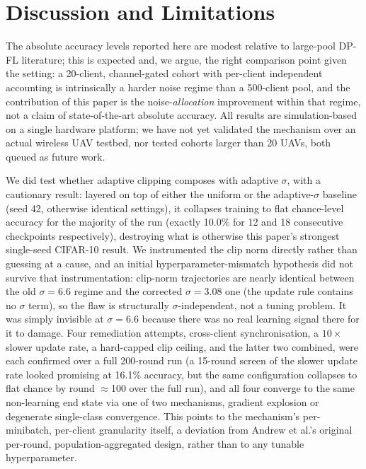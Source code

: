 \documentclass[journal]{IEEEtran}
\begin{document}
\section{Discussion and Limitations}
\label{sec:discussion}

The absolute accuracy levels reported here are modest relative to
large-pool DP-FL literature; this is expected and, we argue, the right
comparison point given the setting: a 20-client, channel-gated cohort
with per-client independent accounting is intrinsically a harder noise
regime than a 500-client pool, and the contribution of this paper is
the noise-\emph{allocation} improvement within that regime, not a claim
of state-of-the-art absolute accuracy. All results are simulation-based
on a single hardware platform; we have not yet validated the mechanism
over an actual wireless UAV testbed, nor tested cohorts larger than 20
UAVs, both queued as future work.

We did test whether adaptive clipping \cite{andrew2021} composes with
adaptive $\sigma$, with a cautionary result: layered on top of either
the uniform or the adaptive-$\sigma$ baseline (seed 42, otherwise
identical settings), it collapses training to flat chance-level
accuracy for the majority of the run (exactly 10.0\% for 12 and 18
consecutive checkpoints respectively), destroying what is otherwise
this paper's strongest single-seed CIFAR-10 result. We instrumented
the clip norm directly rather than guessing at a cause, and an
initial hyperparameter-mismatch hypothesis did not survive that
instrumentation: clip-norm trajectories are nearly identical between
the old $\sigma=6.6$ regime and the corrected $\sigma=3.08$ one (the
update rule contains no $\sigma$ term), so the flaw is structurally
$\sigma$-independent, not a tuning problem. It was simply invisible at
$\sigma=6.6$ because there was no real learning signal there for it to
damage. Four remediation attempts, cross-client synchronisation, a
$10\times$ slower update rate, a hard-capped clip ceiling, and the
latter two combined, were each confirmed over a full 200-round run
(a 15-round screen of the slower update rate looked promising at
16.1\% accuracy, but the same configuration collapses to flat chance
by round $\approx$100 over the full run), and all four converge to the
same non-learning end state via one of two mechanisms, gradient
explosion or degenerate single-class convergence. This points to the
mechanism's per-minibatch, per-client granularity itself, a deviation
from Andrew et al.'s original per-round, population-aggregated design,
rather than to any tunable hyperparameter.
\end{document}
